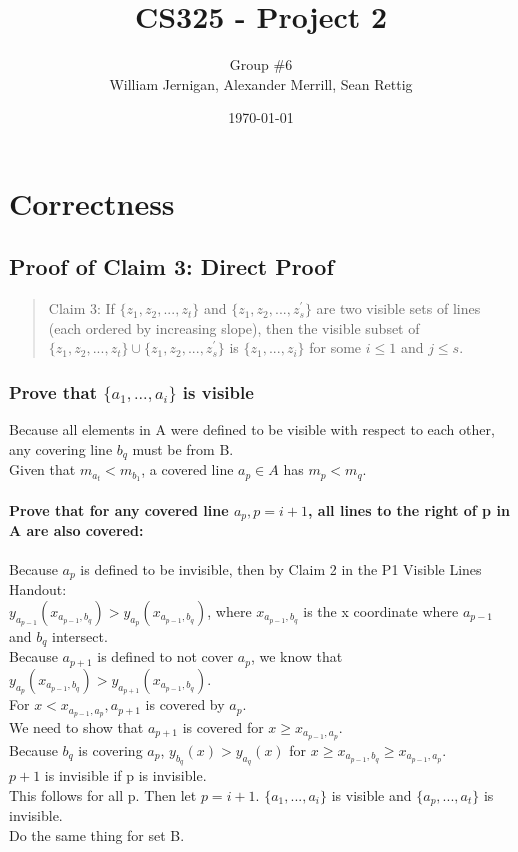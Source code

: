 \documentclass{article}
\title{CS325 - Project 2}
\author{Group \#6 \\ William Jernigan, Alexander Merrill, Sean Rettig}
\date{\today}
\begin{document}
\maketitle

\section*{Correctness}
\subsection*{Proof of Claim 3: Direct Proof}

\begin{quote}
Claim 3: If $\{z_{1},z_{2},...,z_{t}\}$ and $\{z_{1},z_{2},...,z_{s}^{'}\}$ are two visible sets of lines (each ordered by increasing slope), then the visible subset of $\{z_{1},z_{2},...,z_{t}\}\cup\{z_{1},z_{2},...,z_{s}^{'}\}$ is $\{z_{1},...,z_{i}\}$ for some $i \leq 1$ and $j \leq s$.
\end{quote}

\subsubsection*{Prove that $\{a_{1},...,a_{i}\}$ is visible}
    Because all elements in A were defined to be visible with respect to each other, any covering line $b_{q}$ must be from B.\\
    Given that $m_{a_{t}} < m_{b_{1}}$, a covered line $a_{p} \in A$ has $m_{p} < m_{q}$.
    
    \paragraph{Prove that for any covered line  $a_{p}, p = i + 1$, all lines to the right of p in A are also covered:}
        Because $a_p$ is defined to be invisible, then by Claim 2 in the P1 Visible Lines Handout:\\
        $y_{a_{p-1}}(x_{a_{p-1}, b_{q}}) > y_{a_{p}}(x_{a_{p-1},b_{q}})$, where $x_{a_{p-1}, b_{q}}$ is the x coordinate where $a_{p-1}$ and $b_q$ intersect.\\
        Because $a_{p+1}$ is defined to not cover $a_p$, we know that $y_{a_{p}}(x_{a_{p-1}, b_{q}}) > y_{a_{p+1}}(x_{a_{p-1},b_{q}})$.\\
        For $x < x_{a_{p-1},a_{p}}, a_{p+1}$ is covered by $a_p$.\\
        We need to show that $a_{p+1}$ is covered for $x \geq x_{a_{p-1},a_{p}}$.\\
        Because $b_q$ is covering $a_p$, $y_{b_{q}}(x) > y_{a_{q}}(x)$ for $x \geq x_{a_{p-1},b_{q}} \geq x_{a_{p-1},a_{p}}$.\\
        \therefore $p+1$ is invisible if p is invisible.\\
        This follows for all p.
Then let $p = i + 1$. \therefore $\{a_1,...,a_i\}$ is visible and $\{a_p,...,a_t\}$ is invisible.\\
Do the same thing for set B.
\end{document}
